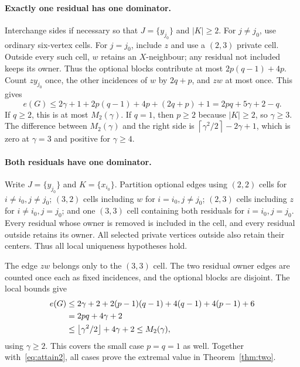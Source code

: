 \documentclass[11pt]{article}
\theoremstyle{definition}
\theoremstyle{remark}
\newcommand{\e}{e}
\newcommand{\ceil}[1]{\left\lceil#1\right\rceil}
\newcommand{\floor}[1]{\left\lfloor#1\right\rfloor}
\begin{document}
\paragraph{Exactly one residual has one dominator.}
Interchange sides if necessary so that $J=\{y_{j_0}\}$ and $|K|\ge2$.
For $j\ne j_0$, use ordinary six-vertex cells. For $j=j_0$, include $z$
and use a $(2,3)$ private cell. Outside every such cell, $w$ retains an
$X$-neighbour; any residual not included keeps its owner. Thus the optional
blocks contribute at most $2p(q-1)+4p$. Count $zy_{j_0}$ once, the other
incidences of $w$ by $2q+p$, and $zw$ at most once. This gives
\begin{equation}\label{eq:two-mixed}
 \e(G)\le2\gamma+1+2p(q-1)+4p+(2q+p)+1
       =2pq+5\gamma+2-q.
\end{equation}
If $q\ge2$, this is at most $M_2(\gamma)$. If $q=1$, then $p\ge2$ because
$|K|\ge2$, so $\gamma\ge3$. The difference between $M_2(\gamma)$ and the
right side is $\ceil{\gamma^2/2}-2\gamma+1$, which is zero at $\gamma=3$
and positive for $\gamma\ge4$.

\paragraph{Both residuals have one dominator.}
Write $J=\{y_{j_0}\}$ and $K=\{x_{i_0}\}$. Partition optional edges using
$(2,2)$ cells for $i\ne i_0,j\ne j_0$; $(3,2)$ cells including $w$ for
$i=i_0,j\ne j_0$; $(2,3)$ cells including $z$ for $i\ne i_0,j=j_0$;
and one $(3,3)$ cell containing both residuals for $i=i_0,j=j_0$.
Every residual whose owner is removed is included in the cell, and every
residual outside retains its owner. All selected private vertices outside
also retain their centers. Thus all local uniqueness hypotheses hold.

The edge $zw$ belongs only to the $(3,3)$ cell. The two residual owner
edges are counted once each as fixed incidences, and the optional blocks
are disjoint. The local bounds give
\begin{align}
 \e(G)&\le2\gamma+2+2(p-1)(q-1)+4(q-1)+4(p-1)+6\notag\\
       &=2pq+4\gamma+2\notag\\
       &\le\floor{\gamma^2/2}+4\gamma+2\le M_2(\gamma),\label{eq:two-single}
\end{align}
using $\gamma\ge2$. This covers the small case $p=q=1$ as well.
Together with~\eqref{eq:attain2}, all cases prove the extremal value in
Theorem~\ref{thm:two}.
\end{document}
